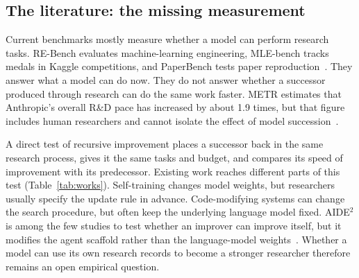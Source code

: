 \documentclass{article}
\begin{document}
\subsection{The literature: the missing measurement}

Current benchmarks mostly measure whether a model can perform research tasks. RE-Bench evaluates machine-learning engineering, MLE-bench tracks medals in Kaggle competitions, and PaperBench tests paper reproduction~\cite{E-01,E-03,E-04}. They answer what a model can do now. They do not answer whether a successor produced through research can do the same work faster. METR estimates that Anthropic's overall R\&D pace has increased by about 1.9 times, but that figure includes human researchers and cannot isolate the effect of model succession~\cite{E-23}.

A direct test of recursive improvement places a successor back in the same research process, gives it the same tasks and budget, and compares its speed of improvement with its predecessor. Existing work reaches different parts of this test (Table~\ref{tab:works}). Self-training changes model weights, but researchers usually specify the update rule in advance. Code-modifying systems can change the search procedure, but often keep the underlying language model fixed. AIDE$^2$ is among the few studies to test whether an improver can improve itself, but it modifies the agent scaffold rather than the language-model weights~\cite{E-28}. Whether a model can use its own research records to become a stronger researcher therefore remains an open empirical question.
\end{document}
